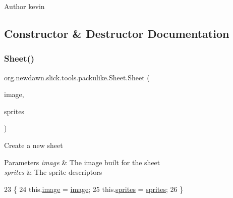 \begin{DoxyAuthor}{Author}
kevin 
\end{DoxyAuthor}


\subsection{Constructor \& Destructor Documentation}
\mbox{\label{classorg_1_1newdawn_1_1slick_1_1tools_1_1packulike_1_1_sheet_ad02822548563742c6d75a068510fa2bb}} 
\subsubsection{\texorpdfstring{Sheet()}{Sheet()}}
{\footnotesize\ttfamily org.\+newdawn.\+slick.\+tools.\+packulike.\+Sheet.\+Sheet (\begin{DoxyParamCaption}\item[{Buffered\+Image}]{image,  }\item[{Array\+List}]{sprites }\end{DoxyParamCaption})\hspace{0.3cm}{\ttfamily [inline]}}

Create a new sheet


\begin{DoxyParams}{Parameters}
{\em image} & The image built for the sheet \\
\hline
{\em sprites} & The sprite descriptors \\
\hline
\end{DoxyParams}

\begin{DoxyCode}
23                                                          \{
24         this.\mbox{\hyperlink{classorg_1_1newdawn_1_1slick_1_1tools_1_1packulike_1_1_sheet_a293f7e890edde54541fcf1e9bed59c13}{image}} = \mbox{\hyperlink{classorg_1_1newdawn_1_1slick_1_1tools_1_1packulike_1_1_sheet_a293f7e890edde54541fcf1e9bed59c13}{image}};
25         this.\mbox{\hyperlink{classorg_1_1newdawn_1_1slick_1_1tools_1_1packulike_1_1_sheet_a57221917a8aa9d65fd4c1488d7b219fb}{sprites}} = \mbox{\hyperlink{classorg_1_1newdawn_1_1slick_1_1tools_1_1packulike_1_1_sheet_a57221917a8aa9d65fd4c1488d7b219fb}{sprites}};
26     \}
\end{DoxyCode}



